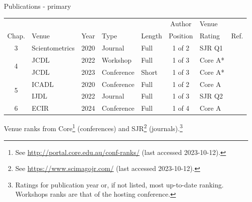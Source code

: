 \documentclass[en,16:9,smallfoot]{sdqbeamer}
\begin{document}
   \begin{frame}{Publications - primary}
    \begin{table}
    \centering
      \begin{tabular}{cllllclr}
        \hline
        \ & \ & \ & \ & \ & Author & Venue & \ \\
        Chap. & Venue & Year & Type & Length & Position & Rating & Ref. \\
        \hline
        3 & Scientometrics & 2020 & Journal & Full & 1 of 2 & SJR Q1 & \cite{Saier2020} \\
        \cline{1-1}
        \multirow{2}{*}{4} & JCDL & 2022 & Workshop & Full & 1 of 3 & Core A* & \cite{Saier2022ULITE} \\
        \ & JCDL & 2023 & Conference & Short & 1 of 3 & Core A* & \cite{Saier2023unarXive} \\
        \cline{1-1}
        \multirow{2}{*}{5} & ICADL & 2020 & Conference & Full & 1 of 2 & Core A & \cite{Saier2020xling} \\
        \ & IJDL & 2022 & Journal & Full & 1 of 3 & SJR Q2 & \cite{Saier2021} \\
        \cline{1-1}
        6 & ECIR & 2024 & Conference & Full & 1 of 4 & Core A & \cite{Saier2024HyperPIE} \\
        \hline
        \end{tabular}
    \end{table}

    Venue ranks from Core\footnote{See \url{http://portal.core.edu.au/conf-ranks/} (last accessed 2023-10-12).} (conferences) and SJR\footnote{See \url{https://www.scimagojr.com/} (last accessed 2023-10-12).} (journals).\footnote{Ratings for publication year or, if not listed, most up-to-date ranking. Workshops ranks are that of the hosting conference.}

   \end{frame}
\end{document}
